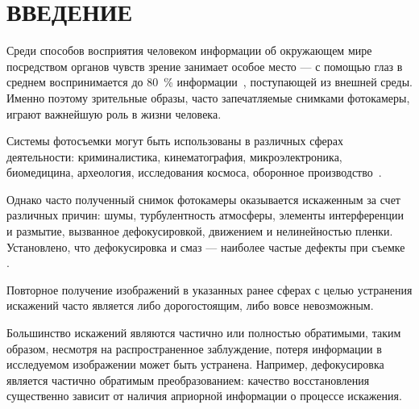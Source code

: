 \chapter*{ВВЕДЕНИЕ}

Среди способов восприятия человеком информации об окружающем мире посредством органов чувств зрение занимает особое место --- с помощью глаз в среднем воспринимается до 80~\% информации~\cite{percent}, поступающей из внешней среды. Именно поэтому зрительные образы, часто запечатляемые снимками фотокамеры, играют важнейшую роль в жизни человека. 

Системы фотосъемки могут быть использованы в различных сферах деятельности: криминалистика, кинематография, микроэлектроника, биомедицина, археология, исследования космоса, оборонное производство~\cite{usage}.

Однако часто полученный снимок фотокамеры оказывается искаженным за счет различных причин: шумы, турбулентность атмосферы, элементы интерференции и размытие, вызванное дефокусировкой, движением и нелинейностью пленки. Установлено, что дефокусировка и смаз --- наиболее частые дефекты при съемке~\cite{degradate} .

Повторное получение изображений в указанных ранее сферах с целью устранения искажений часто является либо дорогостоящим, либо вовсе невозможным.

Большинство искажений являются частично или полностью обратимыми, таким образом, несмотря на распространенное заблуждение, потеря информации в исследуемом изображении может быть устранена. Например, дефокусировка является частично обратимым преобразованием: качество восстановления существенно зависит от наличия априорной информации о процессе искажения. 